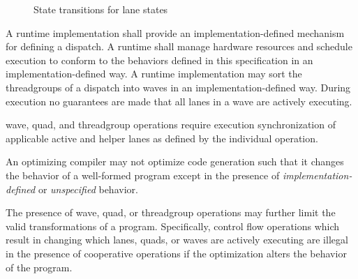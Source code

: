 \begin{center}
\begin{figure}
  \centering
  \caption{State transitions for \gls{lane} states}
\end{figure}
\end{center}


\p A runtime implementation shall provide an implementation-defined mechanism
for defining a \gls{dispatch}. A runtime shall manage hardware resources and
schedule execution to conform to the behaviors defined in this specification in
an implementation-defined way. A runtime implementation may sort the
\gls{threadgroup}s of a \gls{dispatch} into \gls{wave}s in an
implementation-defined way. During execution no guarantees are made that all
\gls{lane}s in a \gls{wave} are actively executing.

\p \gls{wave}, \gls{quad}, and \gls{threadgroup} operations require execution
synchronization of applicable active and helper \gls{lane}s as defined by the
individual operation.


\p An optimizing compiler may not optimize code generation such that it changes
the behavior of a well-formed program except in the presence of
\textit{implementation-defined} or \textit{unspecified} behavior.

\p The presence of \gls{wave}, \gls{quad}, or \gls{threadgroup} operations
may further limit the valid transformations of a program. Specifically, control
flow operations which result in changing which \gls{lane}s, \gls{quad}s, or
\gls{wave}s are actively executing are illegal in the presence of cooperative
operations if the optimization alters the behavior of the program.

